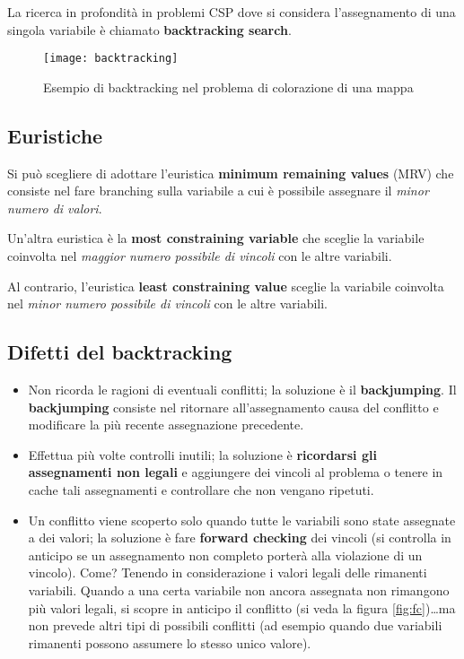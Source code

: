 La ricerca in profondità in problemi CSP dove si considera l'assegnamento
di una singola variabile è chiamato \textbf{backtracking search}.

\begin{figure}[H]
\caption{Esempio di backtracking nel problema di colorazione di una mappa}
\centering
\texttt{[image: backtracking]}
\end{figure}

\subsection{Euristiche}

Si può scegliere di adottare l'euristica \textbf{minimum remaining values}
(MRV) che consiste nel fare branching sulla variabile a cui è possibile
assegnare il \textit{minor numero di valori}.

Un'altra euristica è la \textbf{most constraining variable} che sceglie la
variabile coinvolta nel \textit{maggior numero possibile di vincoli} con le
altre variabili.

Al contrario, l'euristica \textbf{least constraining value} sceglie la
variabile coinvolta nel \textit{minor numero possibile di vincoli} con le
altre variabili.\\

\subsection{Difetti del backtracking}

\begin{itemize}
 \item Non ricorda le ragioni di eventuali conflitti; la soluzione è il
\textbf{backjumping}.
Il \textbf{backjumping} consiste nel ritornare all'assegnamento causa del
conflitto e modificare la più recente assegnazione precedente.

 \item Effettua più volte controlli inutili; la soluzione è \textbf{ricordarsi gli
assegnamenti non legali} e aggiungere dei vincoli al problema o tenere in cache
tali assegnamenti e controllare che non vengano ripetuti.

 \item Un conflitto viene scoperto solo quando tutte le variabili sono state assegnate a
dei valori; la soluzione è fare \textbf{forward checking} dei vincoli (si controlla
in anticipo se un assegnamento non completo porterà alla violazione di un vincolo).
Come? Tenendo in considerazione i valori legali delle rimanenti variabili. Quando a
una certa variabile non ancora assegnata non rimangono più valori legali, si scopre
in anticipo il conflitto (si veda la figura \ref{fig:fc})\dots ma non prevede
altri tipi di possibili conflitti (ad esempio quando due variabili rimanenti possono
assumere lo stesso unico valore).
\end{itemize}

